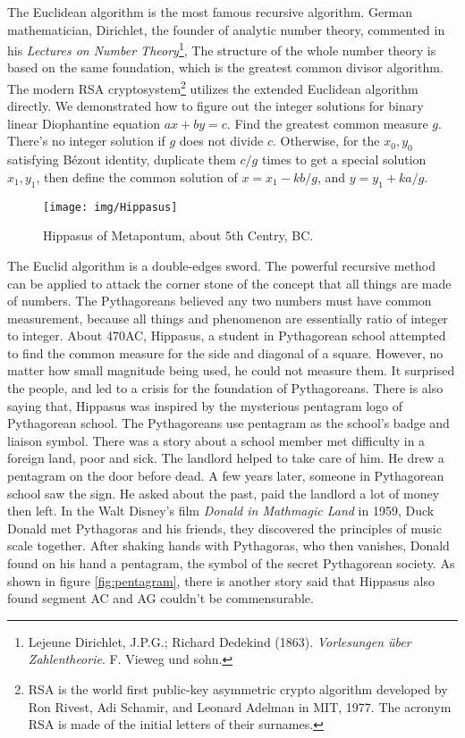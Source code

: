 \documentclass[b5paper]{article}
\begin{document}
The Euclidean algorithm is the most famous recursive algorithm. German mathematician, Dirichlet, the founder of analytic number theory, commented in his {\em Lectures on Number Theory}\footnote{Lejeune Dirichlet, J.P.G.; Richard Dedekind (1863). {\em Vorlesungen über Zahlentheorie}. F. Vieweg und sohn.}, The structure of the whole number theory is based on the same foundation, which is the greatest common divisor algorithm. The modern RSA cryptosystem\footnote{RSA is the world first public-key asymmetric crypto algorithm developed by Ron Rivest, Adi Schamir, and Leonard Adelman in MIT, 1977. The acronym RSA is made of the initial letters of their surnames.} utilizes the extended Euclidean algorithm directly. We demonstrated how to figure out the integer solutions for binary linear Diophantine equation $ax + by = c$. Find the greatest common measure $g$. There's no integer solution if $g$ does not divide $c$. Otherwise, for the $x_0, y_0$ satisfying Bézout identity, duplicate them $c/g$ times to get a special solution $x_1, y_1$, then define the common solution of $x = x_1 - k b / g$, and $y = y_1 + k a / g$.

\begin{figure}[htbp]
 \centering
 \texttt{[image: img/Hippasus]}
 \captionsetup{labelformat=empty}
 \caption{Hippasus of Metapontum, about 5th Centry, BC.}
 \label{fig:Hippasus}
\end{figure}

The Euclid algorithm is a double-edges sword. The powerful recursive method can be applied to attack the corner stone of the concept that all things are made of numbers. The Pythagoreans believed any two numbers must have common measurement, because all things and phenomenon are essentially ratio of integer to integer. About 470AC, Hippasus, a student in Pythagorean school attempted to find the common measure for the side and diagonal of a square. However, no matter how small magnitude being used, he could not measure them. It surprised the people, and led to a crisis for the foundation of Pythagoreans. There is also saying that, Hippasus was inspired by the mysterious pentagram logo of Pythagorean school. The Pythagoreans use pentagram as the school's badge and liaison symbol. There was a story about a school member met difficulty in a foreign land, poor and sick. The landlord helped to take care of him. He drew a pentagram on the door before dead. A few years later, someone in Pythagorean school saw the sign. He asked about the past, paid the landlord a lot of money then left\cite{HanXueTao16}. In the Walt Disney's film {\em Donald in Mathmagic Land} in 1959, Duck Donald met Pythagoras and his friends, they discovered the principles of music scale together. After shaking hands with Pythagoras, who then vanishes, Donald found on his hand a pentagram, the symbol of the secret Pythagorean society. As shown in figure \ref{fig:pentagram}, there is another story said that Hippasus also found segment AC and AG couldn't be commensurable.
\end{document}
